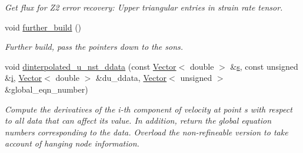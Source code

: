 \begin{DoxyCompactItemize}
\begin{DoxyCompactList}\small\item\em Get \textquotesingle{}flux\textquotesingle{} for Z2 error recovery\+: Upper triangular entries in strain rate tensor. \end{DoxyCompactList}\item 
void \hyperlink{classoomph_1_1RefineableNavierStokesEquations_a7afd6250585ea597c3df65b8c7744da4}{further\+\_\+build} ()
\begin{DoxyCompactList}\small\item\em Further build, pass the pointers down to the sons. \end{DoxyCompactList}\item 
void \hyperlink{classoomph_1_1RefineableNavierStokesEquations_a7cfd72b42cc9fc665fa79ffe9af9f0bd}{dinterpolated\+\_\+u\+\_\+nst\+\_\+ddata} (const \hyperlink{classoomph_1_1Vector}{Vector}$<$ double $>$ \&\hyperlink{cfortran_8h_ab7123126e4885ef647dd9c6e3807a21c}{s}, const unsigned \&\hyperlink{cfortran_8h_adb50e893b86b3e55e751a42eab3cba82}{i}, \hyperlink{classoomph_1_1Vector}{Vector}$<$ double $>$ \&du\+\_\+ddata, \hyperlink{classoomph_1_1Vector}{Vector}$<$ unsigned $>$ \&global\+\_\+eqn\+\_\+number)
\begin{DoxyCompactList}\small\item\em Compute the derivatives of the i-\/th component of velocity at point s with respect to all data that can affect its value. In addition, return the global equation numbers corresponding to the data. Overload the non-\/refineable version to take account of hanging node information. \end{DoxyCompactList}\end{DoxyCompactItemize}
